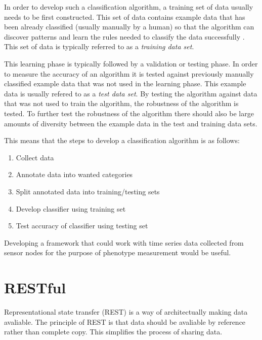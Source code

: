In order to develop such a classification algorithm, a training set of data usually needs to be first constructed. This set of data contains example data that has been already classified (usually manually by a human) so that the algorithm can discover patterns and learn the rules needed to classify the data successfully \cite{someone}. This set of data is typically referred to as a \textit{training data set}. 

This learning phase is typically followed by a validation or testing phase. In order to measure the accuracy of an algorithm it is tested against previously manually classified example data that was not used in the learning phase. This example data is usually refered to as a \textit{test data set}. By testing the algorithm against data that was not used to train the algorithm, the robustness of the algorithm is tested. To further test the robustness of the algorithm there should also be large amounts of diversity between the example data in the test and training data sets.

This means that the steps to develop a classification algorithm is as follows:

\begin{enumerate}
\item Collect data

\item Annotate data into wanted categories

\item Split annotated data into training/testing sets

\item Develop classifier using training set

\item Test accuracy of classifier using testing set
\end{enumerate}

Developing a framework that could work with time series data collected from sensor nodes for the purpose of phenotype measurement would be useful. 

\section{RESTful}
Representational state transfer (REST) is a way of architectually making data avaliable. The principle of REST is that data should be avaliable by reference rather than complete copy. This simplifies the process of sharing data. 

